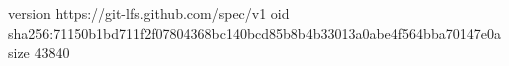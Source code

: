 version https://git-lfs.github.com/spec/v1
oid sha256:71150b1bd711f2f07804368bc140bcd85b8b4b33013a0abe4f564bba70147e0a
size 43840
